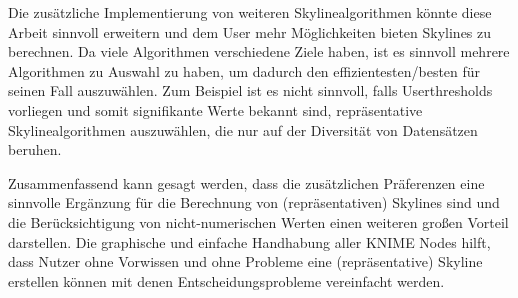 Die zusätzliche Implementierung von weiteren Skylinealgorithmen könnte diese Arbeit sinnvoll erweitern und dem User mehr Möglichkeiten bieten Skylines zu berechnen. Da viele Algorithmen verschiedene Ziele haben, ist es sinnvoll mehrere Algorithmen zu Auswahl zu haben, um dadurch den effizientesten/besten für seinen Fall auszuwählen. Zum Beispiel ist es nicht sinnvoll, falls Userthresholds vorliegen und somit signifikante Werte bekannt sind, repräsentative Skylinealgorithmen auszuwählen, die nur auf der Diversität von Datensätzen beruhen. 

Zusammenfassend kann gesagt werden, dass die zusätzlichen Präferenzen eine sinnvolle Ergänzung für die Berechnung von (repräsentativen) Skylines sind und die Berücksichtigung von nicht-numerischen Werten einen weiteren großen Vorteil darstellen. Die graphische und einfache Handhabung aller KNIME Nodes hilft, dass Nutzer ohne Vorwissen und ohne Probleme eine (repräsentative) Skyline erstellen können mit denen Entscheidungsprobleme vereinfacht werden.
